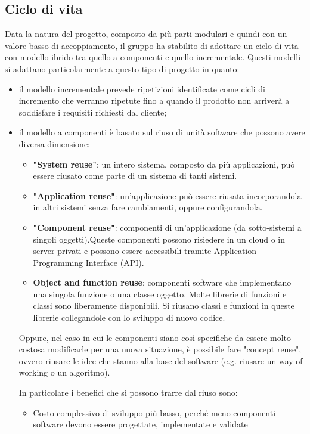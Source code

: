 	\subsection{Ciclo di vita} %
	Data la natura del progetto, composto da più parti modulari e quindi con un valore basso di accoppiamento, il gruppo ha stabilito di adottare un ciclo di vita con modello ibrido tra quello a componenti e quello incrementale.
	Questi modelli si adattano particolarmente a questo tipo di progetto in quanto:
	\begin{itemize}
		\item il modello incrementale prevede ripetizioni identificate come cicli di incremento che verranno ripetute fino a quando il prodotto non arriverà a soddisfare i requisiti richiesti dal cliente;
		\item il modello a componenti è basato sul riuso di unità software che possono avere diversa dimensione:
		\begin{itemize}
			\item \textbf{"System reuse"}: un intero sistema, composto da più applicazioni, può essere riusato come parte di un sistema di tanti sistemi.
			\item \textbf{"Application reuse"}: un'applicazione può essere riusata incorporandola in altri sistemi senza fare cambiamenti, oppure configurandola.
			\item \textbf{"Component reuse"}: componenti di un'applicazione (da sotto-sistemi a singoli oggetti).Queste componenti possono risiedere in un cloud o in server privati e possono essere accessibili tramite Application Programming Interface (API). 
			\item \textbf{Object and function reuse}: componenti software che implementano una singola funzione o una classe oggetto. Molte librerie di funzioni e classi sono liberamente disponibili. Si riusano classi e funzioni in queste librerie collegandole con lo sviluppo di nuovo codice.
		\end{itemize}
		Oppure, nel caso in cui le componenti siano così specifiche da essere molto costosa modificarle per una nuova situazione, è possibile fare "concept reuse", ovvero riusare le idee che stanno alla base del software (e.g. riusare un way of working o un algoritmo). \par
		In particolare i benefici che si possono trarre dal riuso sono:
		\begin{itemize}
			\item Costo complessivo di sviluppo più basso, perché meno componenti software devono essere progettate, implementate e validate

\end{itemize}
\end{itemize}
